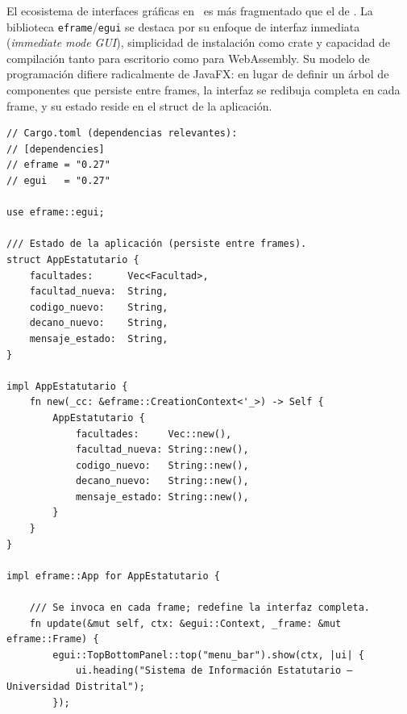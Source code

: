 \noindent
El ecosistema de interfaces gráficas en \rust\ es más fragmentado que el de \java.
La biblioteca \texttt{eframe}/\texttt{egui} se destaca por su enfoque de interfaz
inmediata (\textit{immediate mode GUI}), simplicidad de instalación como crate y
capacidad de compilación tanto para escritorio como para WebAssembly. Su modelo de
programación difiere radicalmente de JavaFX: en lugar de definir un árbol de componentes
que persiste entre frames, la interfaz se redibuja completa en cada frame,
y su estado reside en el struct de la aplicación.

\begin{lstlisting}[style=rustStyle, caption={Interfaz gráfica básica con \texttt{eframe}/\texttt{egui}}, label={lst:egui}]
// Cargo.toml (dependencias relevantes):
// [dependencies]
// eframe = "0.27"
// egui   = "0.27"

use eframe::egui;

/// Estado de la aplicación (persiste entre frames).
struct AppEstatutario {
    facultades:      Vec<Facultad>,
    facultad_nueva:  String,
    codigo_nuevo:    String,
    decano_nuevo:    String,
    mensaje_estado:  String,
}

impl AppEstatutario {
    fn new(_cc: &eframe::CreationContext<'_>) -> Self {
        AppEstatutario {
            facultades:     Vec::new(),
            facultad_nueva: String::new(),
            codigo_nuevo:   String::new(),
            decano_nuevo:   String::new(),
            mensaje_estado: String::new(),
        }
    }
}

impl eframe::App for AppEstatutario {

    /// Se invoca en cada frame; redefine la interfaz completa.
    fn update(&mut self, ctx: &egui::Context, _frame: &mut eframe::Frame) {
        egui::TopBottomPanel::top("menu_bar").show(ctx, |ui| {
            ui.heading("Sistema de Información Estatutario — Universidad Distrital");
        });


\end{lstlisting}
